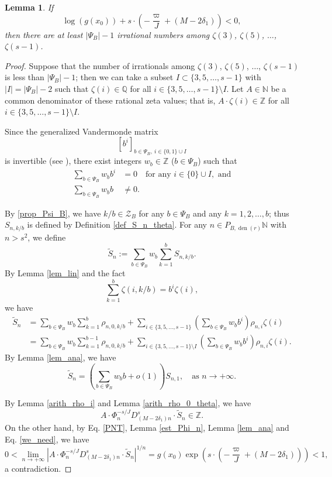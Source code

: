 \documentclass[12pt]{article}
\newtheorem{lemma}[theorem]{Lemma}
\numberwithin{equation}{section}
\begin{document}
\begin{lemma}\label{eli}
If 
\begin{equation}\label{we_need}
\log (g(x_0)) + s \cdot \left( -\frac{\varpi}{J} + (M-2\delta_1) \right) < 0,    
\end{equation}  
then there are at least $|\Psi_B| - 1$ irrational numbers among $\zeta(3)$, $\zeta(5)$, $\ldots$, $\zeta(s-1)$.
\end{lemma}

\begin{proof}
Suppose that the number of irrationals among $\zeta(3)$, $\zeta(5)$, $\ldots$, $\zeta(s-1)$ is less than $|\Psi_B| - 1$; then we can take a subset $I \subset \{ 3,5,\ldots,s-1 \}$ with $|I|= |\Psi_B| -2$ such that $\zeta(i) \in \mathbb{Q}$ for all $i \in \{ 3,5,\ldots,s-1 \} \setminus I$. Let $A \in \mathbb{N}$ be a common denominator of these rational zeta values; that is, $A \cdot \zeta(i) \in \mathbb{Z}$ for all $i \in \{ 3,5,\ldots,s-1 \} \setminus I$.

Since the generalized Vandermonde matrix
\[  \left[  b^{i} \right]_{b \in \Psi_B,~i \in \{ 0,1 \} \cup I}  \]
is invertible (see \cite[\S 4]{FSZ2019}), there exist integers $w_b \in \mathbb{Z}$ ($b \in \Psi_B$) such that 
\begin{align*}
\sum_{b \in \Psi_B} w_b b^{i} &= 0 \quad \text{for any~} i \in \{ 0 \}  \cup I, \text{~and} \\
\sum_{b \in \Psi_B} w_b b  &\neq 0.
\end{align*}

By \eqref{prop_Psi_B}, we have $k/b \in \mathcal{Z}_B$ for any $b \in \Psi_B$ and any $k =1,2,\ldots,b$; thus $S_{n,k/b}$ is defined by Definition \ref{def_S_n_theta}. For any $n \in P_{B,\operatorname{den}(r)}\mathbb{N} $ with $n>s^2$, we define 
\[ \widetilde{S}_{n} := \sum_{b \in \Psi_B} w_b \sum_{k=1}^{b} S_{n,k/b}.  \]
By Lemma \ref{lem_lin} and the fact
\[ \sum_{k=1}^{b} \zeta(i,k/b) = b^{i} \zeta(i), \]
we have
\begin{align*}
\widetilde{S}_{n} &= \sum_{b \in \Psi_B} w_b \sum_{k=1}^{b} \rho_{n,0,k/b} + \sum_{i \in \{3,5,\ldots,s-1\}} \left( \sum_{b \in \Psi_B} w_b b^{i} \right)\rho_{n,i}\zeta(i) \\
&= \sum_{b \in \Psi_B} w_b \sum_{k=1}^{b-1} \rho_{n,0,k/b} + \sum_{i \in \{3,5,\ldots,s-1\}\setminus I} \left( \sum_{b \in \Psi_B} w_b b^{i} \right)\rho_{n,i}\zeta(i).
\end{align*}
By Lemma \ref{lem_ana}, we have 
\[ \widetilde{S}_{n} = \left( \sum_{b \in \Psi_B} w_b b + o(1) \right)S_{n,1}, \quad \text{as~} n \to +\infty. \]

By Lemma \ref{arith_rho_i} and Lemma \ref{arith_rho_0_theta}, we have
\[ A \cdot \Phi_n^{-s/J}  D_{(M-2\delta_1) n}^{s} \cdot \widetilde{S}_{n} \in \mathbb{Z}. \]
On the other hand, by Eq. \eqref{PNT}, Lemma \ref{est_Phi_n}, Lemma \ref{lem_ana} and Eq. \eqref{we_need}, we have
\[ 0 < \lim_{n \to +\infty} \left|   A \cdot \Phi_n^{-s/J} D_{(M-2\delta_1) n}^{s} \cdot \widetilde{S}_{n} \right|^{1/n} = g(x_0)\exp\left( s \cdot \left( -\frac{\varpi}{J} + (M-2\delta_1) \right) \right) < 1,  \]
a contradiction.
\end{proof}
\end{document}
